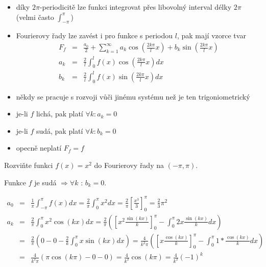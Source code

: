 \begin{poznamka}
\begin{itemize} \quad
\item díky $2 \pi$-periodicitě lze funkci integrovat přes libovolný interval délky $2 \pi$ (velmi často $\int_{-\pi}^{\pi}$)
\item Fourierovy řady lze zavést i pro funkce s periodou $l$, pak mají vzorce tvar
\begin{eqnarray*}
F_f & = & \frac{a_0}{2} + \sum_{k=1}^{\infty} a_k \cos \left( \frac{2 k \pi}{l} x \right) + b_k \sin \left( \frac{2 k \pi}{l} x \right) \\
a_k & = & \frac{2}{l} \int_0^{l} f(x) \cos \left( \frac{2 k \pi}{l} x \right) dx \\
b_k & = & \frac{2}{l} \int_0^l f(x) \sin \left( \frac{2 k \pi}{l} x \right) dx 
\end{eqnarray*}
\item někdy se pracuje s rozvoji vůči jinému systému než je ten trigoniometrický
\item je-li $f$ lichá, pak platí $\forall k : a_k = 0$
\item je-li $f$ sudá, pak platí $\forall k : b_k = 0$
\item opecně neplatí $F_f = f$
\end{itemize}
\end{poznamka}

\begin{priklad}
Rozviňte funkci $f(x) = x^2$ do Fourierovy řady na $(-\pi, \pi)$.
\end{priklad}

Funkce $f$ je sudá $\Rightarrow \forall k \textrm{ : } b_k = 0$.

\begin{eqnarray*}
a_0 & = & \frac{1}{\pi} \int_{-\pi}^{\pi} f(x) dx = \frac{2}{\pi} \int_0^{\pi} x^2 dx = \frac{2}{\pi} \left[ \frac{x^3}{3} \right]_0^\pi = \frac{2}{3} \pi^2 \\
a_k & = & \frac{2}{\pi} \int_{0}^{\pi} x^2 \cos (kx) dx = \frac{2}{\pi} \left( \left[x^2 \frac{\sin (kx)}{k} \right]_0^\pi - \int_0^\pi 2x \frac{\sin (kx)}{k} dx \right) \\
& = & \frac{2}{\pi} \left( 0 - 0 - \frac{2}{k} \int_0^\pi x \sin (kx) dx \right) = \frac{4}{k^2 \pi} \left( \left[ x \frac{\cos (kx)}{k} \right]_0^\pi - \int_0^\pi 1 * \frac{\cos(kx)}{k} dx \right) \\
& = & \frac{4}{k^2 \pi} \left( \pi \cos (k \pi) - 0 - 0 \right) = \frac{4}{k^2} \cos (k \pi) = \frac{4}{k^2} (-1)^k 
\end{eqnarray*}

